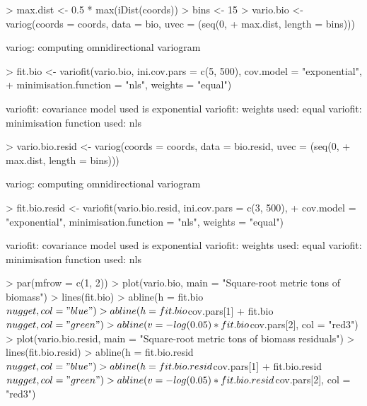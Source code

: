\documentclass{article}
\begin{document}
\begin{Schunk}
\begin{Sinput}
> max.dist <- 0.5 * max(iDist(coords))
> bins <- 15
> vario.bio <- variog(coords = coords, data = bio, uvec = (seq(0, 
+     max.dist, length = bins)))
\end{Sinput}
\begin{Soutput}
variog: computing omnidirectional variogram
\end{Soutput}
\begin{Sinput}
> fit.bio <- variofit(vario.bio, ini.cov.pars = c(5, 500), cov.model = "exponential", 
+     minimisation.function = "nls", weights = "equal")
\end{Sinput}
\begin{Soutput}
variofit: covariance model used is exponential 
variofit: weights used: equal 
variofit: minimisation function used: nls 
\end{Soutput}
\begin{Sinput}
> vario.bio.resid <- variog(coords = coords, data = bio.resid, uvec = (seq(0, 
+     max.dist, length = bins)))
\end{Sinput}
\begin{Soutput}
variog: computing omnidirectional variogram
\end{Soutput}
\begin{Sinput}
> fit.bio.resid <- variofit(vario.bio.resid, ini.cov.pars = c(3, 500), 
+     cov.model = "exponential", minimisation.function = "nls", weights = "equal")
\end{Sinput}
\begin{Soutput}
variofit: covariance model used is exponential 
variofit: weights used: equal 
variofit: minimisation function used: nls 
\end{Soutput}
\begin{Sinput}
> par(mfrow = c(1, 2))
> plot(vario.bio, main = "Square-root metric tons of biomass")
> lines(fit.bio)
> abline(h = fit.bio$nugget, col = "blue")
> abline(h = fit.bio$cov.pars[1] + fit.bio$nugget, col = "green")
> abline(v = -log(0.05) * fit.bio$cov.pars[2], col = "red3")
> plot(vario.bio.resid, main = "Square-root metric tons of biomass residuals")
> lines(fit.bio.resid)
> abline(h = fit.bio.resid$nugget, col = "blue")
> abline(h = fit.bio.resid$cov.pars[1] + fit.bio.resid$nugget, col = "green")
> abline(v = -log(0.05) * fit.bio.resid$cov.pars[2], col = "red3")
\end{Sinput}
\end{Schunk}
\end{document}
